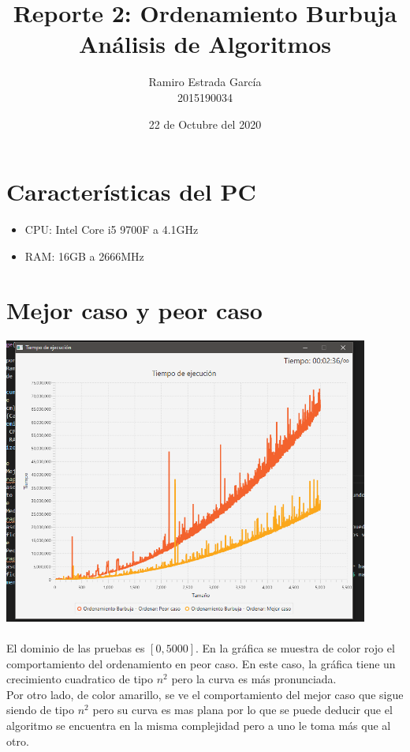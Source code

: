 \documentclass{article}
\title{Reporte 2: Ordenamiento Burbuja\\\textbf{Análisis de Algoritmos}}
\author{ Ramiro Estrada García\\2015190034 }
\date{22 de Octubre del 2020}
\begin{document}
\maketitle
\vspace{5cm}
\section {Características del PC}
\begin{itemize}
	\item CPU: Intel Core i5 9700F a 4.1GHz
	\item RAM: 16GB a 2666MHz
\end{itemize}
\newpage
\maketitle
\section{Mejor caso y peor caso}
\includegraphics[width=12cm]{mejor-peor.png}
\\ \\
El dominio de las pruebas es $[0, 5000]$. 
En la gráfica se muestra de color rojo el comportamiento del ordenamiento
en peor caso. En este caso, la gráfica tiene un crecimiento cuadratico de
tipo $n^2$ pero la curva es más pronunciada.\\
Por otro lado, de color amarillo, se ve el comportamiento del mejor caso
que sigue siendo de tipo $n^2$ pero su curva es mas plana por lo que se puede
deducir que el algoritmo se encuentra en la misma complejidad pero a uno le toma
más que al otro.
\end{document}
